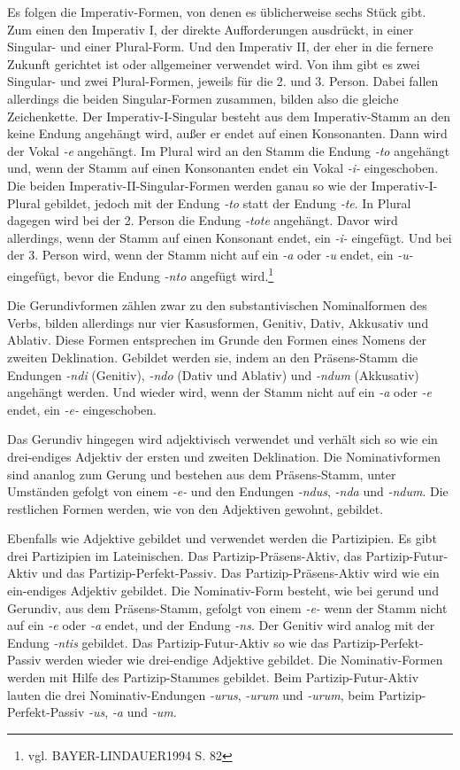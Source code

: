 \documentclass[12pt,abstract=on,titlepage,bibliography=totoc,ngerman,listof=totoc]{scrreprt}
\begin{document}
Es folgen die Imperativ-Formen, von denen es üblicherweise sechs Stück gibt. Zum einen den Imperativ I, der direkte Aufforderungen ausdrückt, in einer Singular- und einer Plural-Form. Und den Imperativ II, der eher in die fernere Zukunft gerichtet ist oder allgemeiner verwendet wird. Von ihm gibt es zwei Singular- und zwei Plural-Formen, jeweils für die 2. und 3. Person. Dabei fallen allerdings die beiden Singular-Formen zusammen, bilden also die gleiche Zeichenkette. Der Imperativ-I-Singular besteht aus dem Imperativ-Stamm an den keine Endung angehängt wird, außer er endet auf einen Konsonanten. Dann wird der Vokal \textit{-e} angehängt. Im Plural wird an den Stamm die Endung \textit{-to} angehängt und, wenn der Stamm auf einen Konsonanten endet ein Vokal \textit{-i-} eingeschoben. Die beiden Imperativ-II-Singular-Formen werden ganau so wie der Imperativ-I-Plural gebildet, jedoch mit der Endung \textit{-to} statt der Endung \textit{-te}. In Plural dagegen wird bei der 2. Person die Endung \textit{-tote} angehängt. Davor wird allerdings, wenn der Stamm auf einen Konsonant endet, ein \textit{-i-} eingefügt. Und bei der 3. Person wird, wenn der Stamm nicht auf ein \textit{-a} oder \textit{-u} endet, ein \textit{-u-} eingefügt, bevor die Endung \textit{-nto} angefügt wird.\footnote{vgl. BAYER-LINDAUER1994 S. 82} \par
Die Gerundivformen zählen zwar zu den substantivischen Nominalformen des Verbs, bilden allerdings nur vier Kasusformen, Genitiv, Dativ, Akkusativ und Ablativ. Diese Formen entsprechen im Grunde den Formen eines Nomens der zweiten Deklination. Gebildet werden sie, indem an den Präsens-Stamm die Endungen \textit{-ndi} (Genitiv), \textit{-ndo} (Dativ und Ablativ) und \textit{-ndum} (Akkusativ) angehängt werden. Und wieder wird, wenn der Stamm nicht auf ein \textit{-a} oder \textit{-e} endet, ein \textit{-e-} eingeschoben.\par
Das Gerundiv hingegen wird adjektivisch verwendet und verhält sich so wie ein drei-endiges Adjektiv der ersten und zweiten Deklination. Die Nominativformen sind ananlog zum Gerung und bestehen aus dem Präsens-Stamm, unter Umständen gefolgt von einem \textit{-e-} und den Endungen \textit{-ndus}, \textit{-nda} und \textit{-ndum}. Die restlichen Formen werden, wie von den Adjektiven gewohnt, gebildet.\par
Ebenfalls wie Adjektive gebildet und verwendet werden die Partizipien. Es gibt drei Partizipien im Lateinischen. Das Partizip-Präsens-Aktiv, das Partizip-Futur-Aktiv und das Partizip-Perfekt-Passiv. Das Partizip-Präsens-Aktiv wird wie ein ein-endiges Adjektiv gebildet. Die Nominativ-Form besteht, wie bei gerund und Gerundiv, aus dem Präsens-Stamm, gefolgt von einem \textit{-e-} wenn der Stamm nicht auf ein \textit{-e} oder \textit{-a} endet, und der Endung \textit{-ns}. Der Genitiv wird analog mit der Endung \textit{-ntis} gebildet. Das Partizip-Futur-Aktiv so wie das Partizip-Perfekt-Passiv werden wieder wie drei-endige Adjektive gebildet. Die Nominativ-Formen werden mit Hilfe des Partizip-Stammes gebildet. Beim Partizip-Futur-Aktiv lauten die drei Nominativ-Endungen \textit{-urus}, \textit{-urum} und \textit{-urum}, beim Partizip-Perfekt-Passiv \textit{-us}, \textit{-a} und \textit{-um}.
\end{document}
